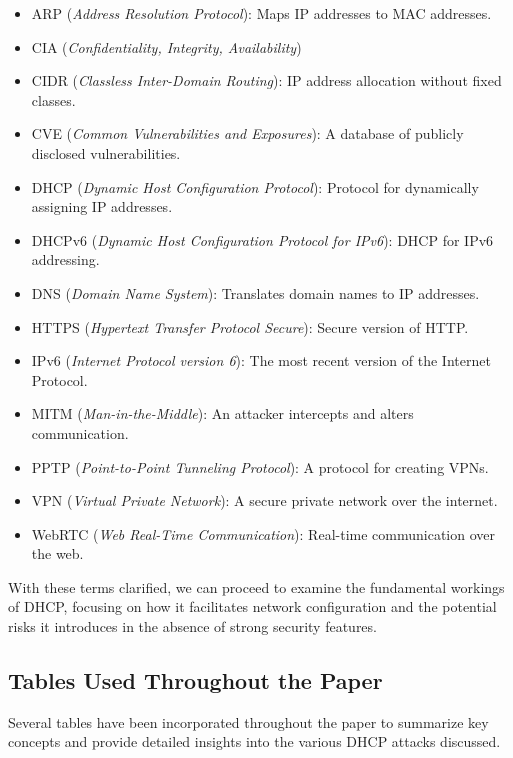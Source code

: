 \documentclass[conference]{IEEEtran}
\begin{document}
        \begin{itemize}
            \item ARP (\textit{Address Resolution Protocol}): Maps IP addresses to MAC addresses.
            \item CIA (\textit{Confidentiality, Integrity, Availability})
            \item CIDR (\textit{Classless Inter-Domain Routing}): IP address allocation without fixed classes.
            \item CVE (\textit{Common Vulnerabilities and Exposures}): A database of publicly disclosed vulnerabilities.
            \item DHCP (\textit{Dynamic Host Configuration Protocol}): Protocol for dynamically assigning IP addresses.
            \item DHCPv6 (\textit{Dynamic Host Configuration Protocol for IPv6}): DHCP for IPv6 addressing.
            \item DNS (\textit{Domain Name System}): Translates domain names to IP addresses.
            \item HTTPS (\textit{Hypertext Transfer Protocol Secure}): Secure version of HTTP.
            \item IPv6 (\textit{Internet Protocol version 6}): The most recent version of the Internet Protocol.
            \item MITM (\textit{Man-in-the-Middle}): An attacker intercepts and alters communication.
            \item PPTP (\textit{Point-to-Point Tunneling Protocol}): A protocol for creating VPNs.
            \item VPN (\textit{Virtual Private Network}): A secure private network over the internet.
            \item WebRTC (\textit{Web Real-Time Communication}): Real-time communication over the web.
        \end{itemize}

        With these terms clarified, we can proceed to examine the fundamental workings of DHCP, focusing on how it facilitates network configuration and the potential risks it introduces in the absence of strong security features.

    \subsection{Tables Used Throughout the Paper}
    \label{subsec:Tables}
        
        Several tables have been incorporated throughout the paper to summarize key concepts and provide detailed insights into the various DHCP attacks discussed.
        
\end{document}
